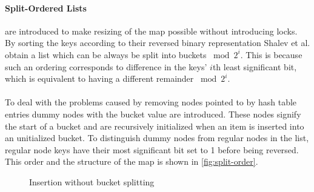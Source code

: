 \documentclass{uit-thesis}
\begin{document}
\paragraph{Split-Ordered Lists} are introduced to make resizing of the map possible without introducing locks. By sorting the keys according to their reversed binary representation Shalev et al. obtain a list which can be always be split into buckets $\bmod{2^i}$. This is because such an ordering corresponds to difference in the keys' $i$th least significant bit, which is equivalent to having a different remainder $\bmod{2^i}$.\\\\
To deal with the problems caused by removing nodes pointed to by hash table entries dummy nodes with the bucket value are introduced. These nodes signify the start of a bucket and are recursively initialized when an item is inserted into an unitialized bucket. To distinguish dummy nodes from regular nodes in the list, regular node keys have their most significant bit set to 1 before being reversed. This order and the structure of the map is shown in \autoref{fig:split-order}.
\begin{figure}[h!]
    \centering
    \newline
\caption{Insertion without bucket splitting}    
\label{fig:simple-insert}
\end{figure}
\end{document}
